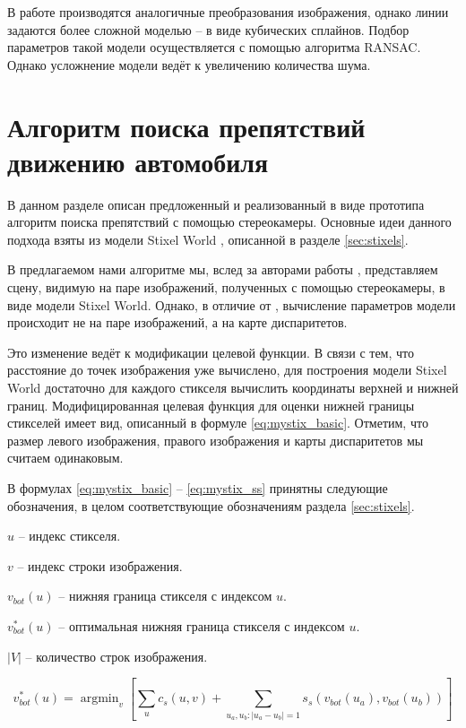\documentclass[aps,%
14pt,%
final,%
oneside,
onecolumn,%
musixtex, %
superscriptaddress,%
centertags]{extarticle} %
\DeclareMathOperator*{\argmin}{argmin}
\begin{document}
В работе \cite{aly2008real} производятся аналогичные преобразования изображения, однако линии задаются более сложной моделью -- в виде кубических сплайнов. Подбор параметров такой модели осуществляется с помощью алгоритма RANSAC. Однако усложнение модели ведёт к увеличению количества шума.


\newpage
\section{Алгоритм поиска препятствий движению автомобиля}

В данном разделе описан предложенный и реализованный в виде прототипа алгоритм поиска препятствий с помощью стереокамеры. Основные идеи данного подхода взяты из модели Stixel World \cite{pfeiffer2010efficient}, описанной в разделе \ref{sec:stixels}.

В предлагаемом нами алгоритме мы, вслед за авторами работы \cite{pfeiffer2010efficient}, представляем сцену, видимую на паре изображений, полученных с помощью стереокамеры, в виде модели Stixel World. Однако, в отличие от \cite{pfeiffer2010efficient}, вычисление параметров модели происходит не на паре изображений, а на карте диспаритетов.

Это изменение ведёт к модификации целевой функции. В связи с тем, что расстояние до точек изображения уже вычислено, для построения модели Stixel World достаточно для каждого стикселя вычислить координаты верхней и нижней границ. Модифицированная целевая функция для оценки нижней границы стикселей имеет вид, описанный в формуле \ref{eq:mystix_basic}. Отметим, что размер левого изображения, правого изображения и карты диспаритетов мы считаем одинаковым.

В формулах \ref{eq:mystix_basic} -- \ref{eq:mystix_ss} принятны следующие обозначения, в целом соответствующие обозначениям раздела \ref{sec:stixels}.

$u$ -- индекс стикселя.

$v$ -- индекс строки изображения.

$v_{bot}(u)$ -- нижняя граница стикселя с индексом $u$.

$v_{bot}^*(u)$ -- оптимальная нижняя граница стикселя с индексом $u$.

$|V|$ -- количество строк изображения.

\begin{equation}\label{eq:mystix_basic}
v_{bot}^*(u) = \argmin_{v}[\sum_u c_s(u, v) + \sum_{u_a, u_b: |u_a - u_b| = 1} s_s(v_{bot}(u_a), v_{bot}(u_b))]
\end{equation}
\end{document}
